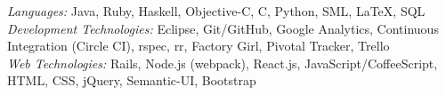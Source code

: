 {\sl Languages:} Java, Ruby, Haskell, Objective-C, C, Python, SML,  \LaTeX , SQL \\
{\sl Development Technologies:} Eclipse, Git/GitHub, Google Analytics, Continuous Integration (Circle CI), rspec, rr, Factory Girl, Pivotal Tracker, Trello \\
{\sl Web Technologies:} Rails, Node.js (webpack), React.js,  JavaScript/CoffeeScript, HTML, CSS, jQuery, Semantic-UI, Bootstrap
